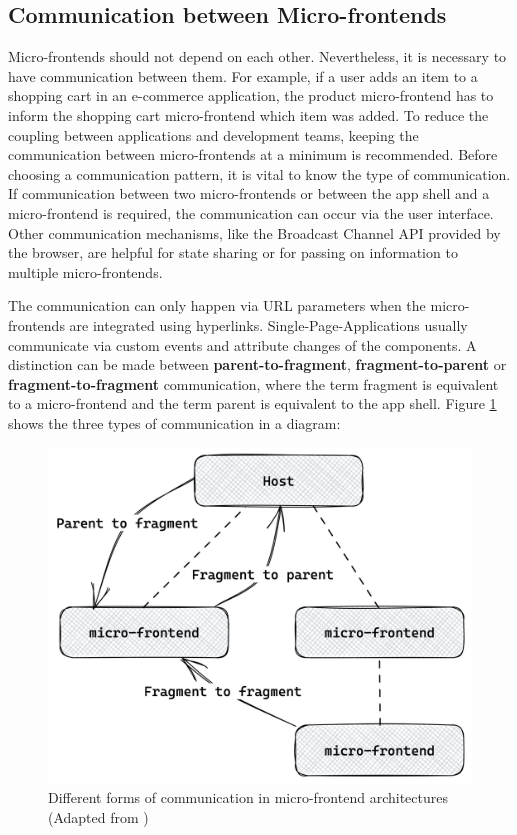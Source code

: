 \subsection{Communication between Micro-frontends}\label{subsection:background:micro-frontend:communication-patterns}

Micro-frontends should not depend on each other. Nevertheless, it is necessary to have communication between them. For example, if a user adds an item to a shopping cart in an e-commerce application, the product micro-frontend has to inform the shopping cart micro-frontend which item was added. To reduce the coupling between applications and development teams, keeping the communication between micro-frontends at a minimum is recommended. Before choosing a communication pattern, it is vital to know the type of communication. If communication between two micro-frontends or between the app shell and a micro-frontend is required, the communication can occur via the user interface. Other communication mechanisms, like the Broadcast Channel API provided by the browser, are helpful for state sharing or for passing on information to multiple micro-frontends.  \cite{book:2020:geers:background:micro-frontends:micro-frontends-in-action}

\bigskip

\noindent The communication can only happen via URL parameters when the micro-frontends are integrated using hyperlinks. Single-Page-Applications usually communicate via custom events and attribute changes of the components. \cite[100]{book:2020:geers:background:micro-frontends:micro-frontends-in-action} \cite[315-316]{book:2019:farrell:background:micro-frontends:web-components-in-action} A distinction can be made between \textbf{parent-to-fragment}, \textbf{fragment-to-parent} or \textbf{fragment-to-fragment} communication, where the term fragment is equivalent to a micro-frontend and the term parent is equivalent to the app shell. \cite{book:2020:geers:background:micro-frontends:micro-frontends-in-action} Figure \ref{fig:background:micro-frontend:communication:communication-patterns} shows the three types of communication in a diagram:

\ifshowImages
\begin{figure}[H]
    \centering
    \includegraphics[width=0.5\linewidth]{images/background/communication/communication-patterns.png}
    \caption{Different forms of communication in micro-frontend architectures (Adapted from \cite[100]{book:2020:geers:background:micro-frontends:micro-frontends-in-action})}\label{fig:background:micro-frontend:communication:communication-patterns}
\end{figure}
\fi

